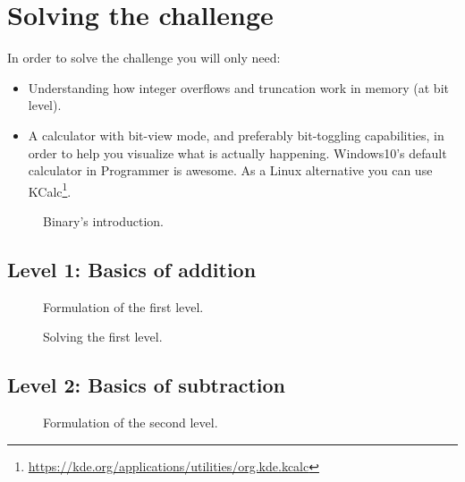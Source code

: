 \chapter{Solving the challenge}

In order to solve the challenge you will only need:
\begin{itemize}
	\item{Understanding how integer overflows and truncation work in memory (at bit level).}
	\item{A calculator with bit-view mode, and preferably bit-toggling capabilities, in order to help you visualize what is actually happening. Windows10's default calculator in Programmer is awesome. As a Linux alternative you can use KCalc\footnote{\url{https://kde.org/applications/utilities/org.kde.kcalc}}.}
\end{itemize}

\begin{figure}[h]
	\label{fig:binary_intro}
	\caption{Binary's introduction.}
\end{figure}

\section{Level 1: Basics of addition}

\begin{figure}[h!]
	\label{fig:intro_level1}
	\caption{Formulation of the first level.}
\end{figure}

\begin{figure}[h!]
	\label{fig:solved_level1}
	\caption{Solving the first level.}
\end{figure}

\section{Level 2: Basics of subtraction}

\begin{figure}[h!]
	\label{fig:intro_level2}
	\caption{Formulation of the second level.}
\end{figure}

